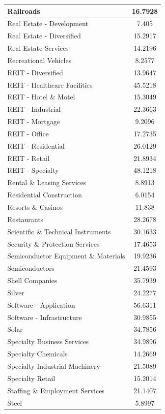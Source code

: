 \documentclass{article}
\begin{document}
\begin{xtabular}{|l|c|}
Railroads & 16.7928\\ \hline
Real Estate - Development & 7.405\\ \hline
Real Estate - Diversified & 15.2917\\ \hline
Real Estate Services & 14.2196\\ \hline
Recreational Vehicles & 8.2577\\ \hline
REIT - Diversified & 13.9647\\ \hline
REIT - Healthcare Facilities & 45.5218\\ \hline
REIT - Hotel \& Motel & 15.3049\\ \hline
REIT - Industrial & 22.3663\\ \hline
REIT - Mortgage & 9.2096\\ \hline
REIT - Office & 17.2735\\ \hline
REIT - Residential & 26.0129\\ \hline
REIT - Retail & 21.8934\\ \hline
REIT - Specialty & 48.1218\\ \hline
Rental \& Leasing Services & 8.8913\\ \hline
Residential Construction & 6.0154\\ \hline
Resorts \& Casinos & 11.838\\ \hline
Restaurants & 28.2678\\ \hline
Scientific \& Technical Instruments & 30.1633\\ \hline
Security \& Protection Services & 17.4653\\ \hline
Semiconductor Equipment \& Materials & 19.9236\\ \hline
Semiconductors & 21.4593\\ \hline
Shell Companies & 35.7939\\ \hline
Silver & 24.2277\\ \hline
Software - Application & 56.6311\\ \hline
Software - Infrastructure & 30.9855\\ \hline
Solar & 34.7856\\ \hline
Specialty Business Services & 34.9896\\ \hline
Specialty Chemicals & 14.2669\\ \hline
Specialty Industrial Machinery & 21.5089\\ \hline
Specialty Retail & 15.2014\\ \hline
Staffing \& Employment Services & 21.1407\\ \hline
Steel & 5.8997\\ \hline

\end{xtabular}
\end{document}
